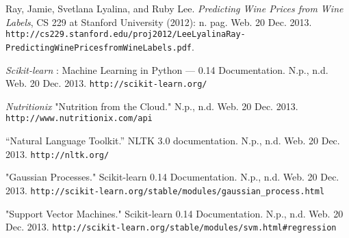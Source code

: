 \documentclass{article}
\begin{document}
\begin{thebibliography}{10}

Ray, Jamie, Svetlana Lyalina, and Ruby Lee.
\emph{Predicting Wine Prices from Wine Labels}, CS 229 at Stanford University (2012): n. pag. Web. 20 Dec. 2013.
\texttt{http://cs229.stanford.edu/proj2012/LeeLyalinaRay-PredictingWinePricesfromWineLabels.pdf}.

\emph{Scikit-learn} : Machine Learning in Python — 0.14 Documentation. N.p., n.d. Web. 20 Dec. 2013.
\texttt{http://scikit-learn.org/}

 \emph{Nutritionix} "Nutrition from the Cloud." N.p., n.d. Web. 20 Dec. 2013. \texttt{http://www.nutritionix.com/api}

 “Natural Language Toolkit.” NLTK 3.0 documentation. N.p., n.d. Web. 20 Dec. 2013. \texttt{http://nltk.org/}

 "Gaussian Processes." Scikit-learn 0.14 Documentation. N.p., n.d. Web. 20 Dec. 2013. \texttt{http://scikit-learn.org/stable/modules/gaussian\_process.html}

 "Support Vector Machines." Scikit-learn 0.14 Documentation. N.p., n.d. Web. 20 Dec. 2013. \texttt{http://scikit-learn.org/stable/modules/svm.html\#regression}

\end{thebibliography}
\end{document}
